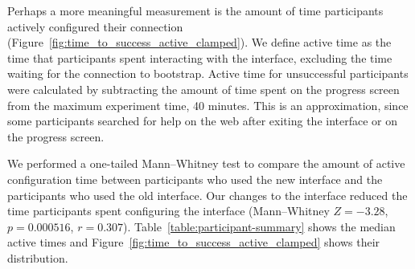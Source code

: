 \documentclass[USenglish,oneside,twocolumn]{article}
\begin{document}
{Perhaps a more meaningful measurement is the amount of time participants actively configured their connection (Figure~\ref{fig:time_to_success_active_clamped}). We define active time as the time that participants spent interacting with the interface, excluding the time waiting for the connection to bootstrap. Active time for unsuccessful participants were calculated by subtracting the amount of time spent on the progress screen from the maximum experiment time, 40 minutes. This is an approximation, since some participants searched for help on the web after exiting the interface or on the progress screen. 

We performed a one-tailed Mann--Whitney test to compare the amount of active configuration time between participants who used the new interface and the participants who used the old interface. Our changes to the interface reduced the time participants spent configuring the interface (Mann--Whitney $Z = -3.28$, $p = 0.000516$, $r = 0.307$).  Table~\ref{table:participant-summary} shows the median active times and Figure~\ref{fig:time_to_success_active_clamped} shows their distribution.
}
\end{document}
